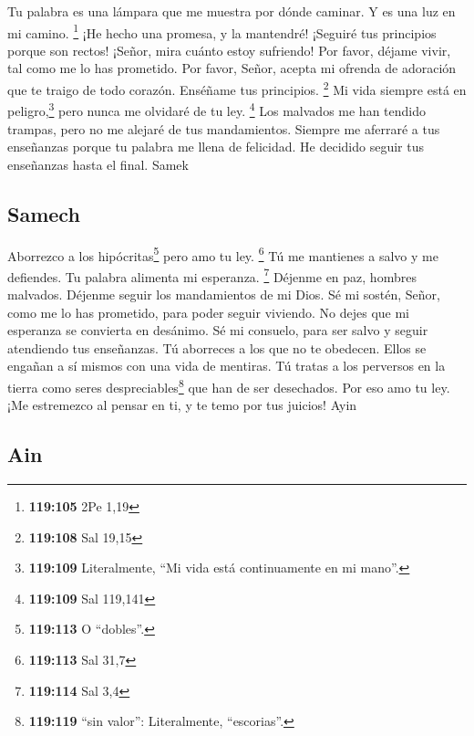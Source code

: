  Tu palabra es una lámpara que me muestra por dónde
caminar. Y es una luz en mi camino. \footnote{\textbf{119:105} 2Pe 1,19}
 ¡He hecho una promesa, y la mantendré! ¡Seguiré tus
principios porque son rectos!  ¡Señor, mira cuánto estoy
sufriendo! Por favor, déjame vivir, tal como me lo has prometido.
 Por favor, Señor, acepta mi ofrenda de adoración que te
traigo de todo corazón. Enséñame tus principios. \footnote{\textbf{119:108}
  Sal 19,15}  Mi vida siempre está en
peligro,\footnote{\textbf{119:109} Literalmente, ``Mi vida está
  continuamente en mi mano''.} pero nunca me olvidaré de tu ley.
\footnote{\textbf{119:109} Sal 119,141}  Los malvados me
han tendido trampas, pero no me alejaré de tus mandamientos.
 Siempre me aferraré a tus enseñanzas porque tu palabra
me llena de felicidad.  He decidido seguir tus
enseñanzas hasta el final. Samek

\hypertarget{samech}{%
\subsection{Samech}\label{samech}}

 Aborrezco a los hipócritas\footnote{\textbf{119:113} O
  ``dobles''.} pero amo tu ley. \footnote{\textbf{119:113} Sal 31,7}
 Tú me mantienes a salvo y me defiendes. Tu palabra
alimenta mi esperanza. \footnote{\textbf{119:114} Sal 3,4}
 Déjenme en paz, hombres malvados. Déjenme seguir los
mandamientos de mi Dios.  Sé mi sostén, Señor, como me
lo has prometido, para poder seguir viviendo. No dejes que mi esperanza
se convierta en desánimo.  Sé mi consuelo, para ser
salvo y seguir atendiendo tus enseñanzas.  Tú aborreces
a los que no te obedecen. Ellos se engañan a sí mismos con una vida de
mentiras.  Tú tratas a los perversos en la tierra como
seres despreciables\footnote{\textbf{119:119} ``sin valor'':
  Literalmente, ``escorias''.} que han de ser desechados. Por eso amo tu
ley.  ¡Me estremezco al pensar en ti, y te temo por tus
juicios! Ayin

\hypertarget{ain}{%
\subsection{Ain}\label{ain}}

